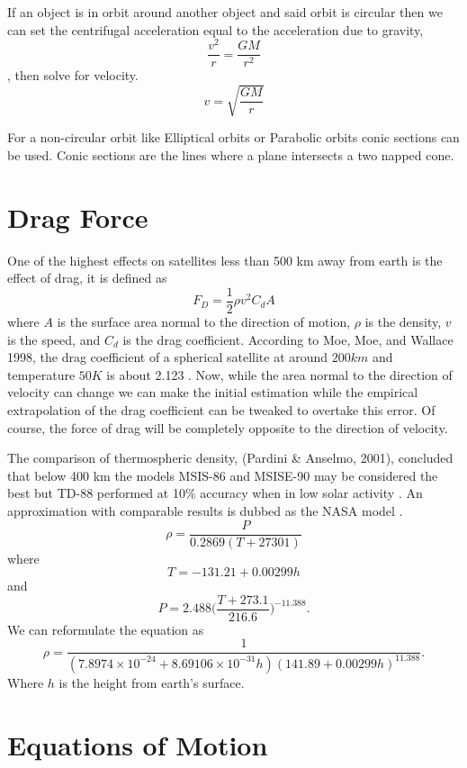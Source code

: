 If an object is in orbit around another object and said orbit is circular then we can set the centrifugal acceleration equal to the acceleration due to gravity, $$\frac{v^2}{r}=\frac{GM}{r^2}$$, then solve for velocity.
\begin{equation}
v=\sqrt{\frac{GM}{r}}
\end{equation}

For a non-circular orbit like Elliptical orbits or Parabolic orbits conic sections can be used. Conic sections are the lines where a plane intersects a two napped cone.

\section{Drag Force}

One of the highest effects on satellites less than 500 km away from earth is the effect of drag, it is defined as $$F_D=\frac{1}{2}\rho v^2 C_d A$$ where $A$ is the surface area normal to the direction of motion, $\rho$ is the density, $v$ is the speed, and $C_d$ is the drag coefficient. According to Moe, Moe, and Wallace 1998, the drag coefficient of a spherical satellite at around $200km$ and temperature $50K$ is about 2.123 \cite{moe_moe_wallace_1998}. Now, while the area normal to the direction of velocity can change we can make the initial estimation while the empirical extrapolation of the drag coefficient can be tweaked to overtake this error. Of course, the force of drag will be completely opposite to the direction of velocity.

The comparison of thermospheric density, (Pardini \& Anselmo, 2001), concluded that below 400 km the models MSIS-86 and MSISE-90 may be considered the best but TD-88 performed at 10\% accuracy when in low solar activity \cite{pardini_anselmo_2001}. An approximation with comparable results is dubbed as the NASA model \cite{brito_celestino_moraes_2015, nasa}.
\begin{equation}
\rho=\frac{P}{0.2869(T+27301)}
\end{equation} where $$T=-131.21+0.00299h$$ and $$P=2.488\bigg(\frac{T+273.1}{216.6}\bigg)^{-11.388}.$$
We can reformulate the equation as 
\begin{equation}\label{eq:density}
\rho=\frac{1}{(7.8974\times10^{-24}+8.69106\times10^{-31}h)(141.89+0.00299h)^{11.388}}.
\end{equation} Where $h$ is the height from earth's surface.

\section{Equations of Motion}

